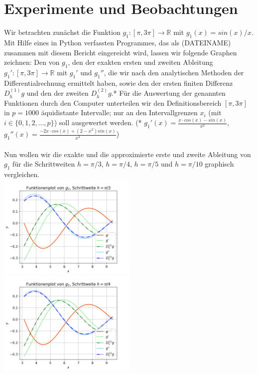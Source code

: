 \documentclass{scrartcl}
\begin{document}
\pagebreak \section{Experimente und Beobachtungen}
\label{sec:experimente}

Wir betrachten zunächst die Funktion $g_1:[\pi, 3\pi] \rightarrow \mathbb{R}$ mit $g_1(x) = sin(x)/x$. Mit Hilfe eines in Python verfassten Programmes, das als (DATEINAME) zusammen mit diesem Bericht eingereicht wird, lassen wir folgende Graphen zeichnen:
Den von $g_1$, den der exakten ersten und zweiten Ableitung $g_1': [\pi, 3\pi] \rightarrow \mathbb{R}$ mit $g_1'$ und $g_1''$, die wir nach den analytischen Methoden der Differentialrechnung ermittelt haben, sowie den der ersten finiten Differenz $D_h^{(1)}g$ und den der zweiten $D_h^{(2)}g$.*
Für die Auswertung der genannten Funktionen durch den Computer unterteilen wir den Definitionsbereich $[\pi, 3\pi]$ in $p = 1000$ äquidistante Intervalle; nur an den Intervallgrenzen $x_i$ (mit $i \in \lbrace 0, 1, 2, ..., p \rbrace$) soll ausgewertet werden.
(* $g_1'(x) = \frac{x \cdot cos(x) - sin(x)}{x^{2}}$, $g_1''(x) = \frac{-2x \cdot cos(x) + (2-x^{2}) sin(x)}{x^{3}}$) \\
\\
Nun wollen wir die exakte und die approximierte erste und zweite Ableitung von $g_1$ für die Schrittweiten $h = \pi/3$, $h = \pi/4$, $h = \pi/5$ und $h = \pi/10$ graphisch vergleichen. \\
\includegraphics[width=0.5\textwidth]{Grafiken/Funktionenplot_Pi_Drittel} \includegraphics[width=0.5\textwidth]{Grafiken/Funktionenplot_Pi_Viertel}\\
\end{document}
